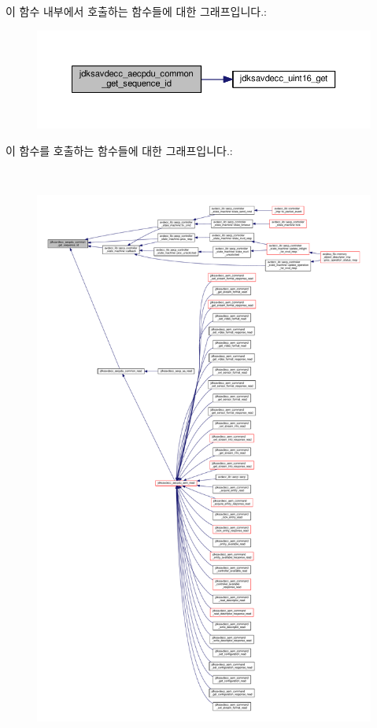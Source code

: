 이 함수 내부에서 호출하는 함수들에 대한 그래프입니다.\+:
\nopagebreak
\begin{figure}[H]
\begin{center}
\leavevmode
\includegraphics[width=350pt]{group__aecpdu__common_ga4c5015b65543e4753c336d98b63fea28_cgraph}
\end{center}
\end{figure}




이 함수를 호출하는 함수들에 대한 그래프입니다.\+:
\nopagebreak
\begin{figure}[H]
\begin{center}
\leavevmode
\includegraphics[height=550pt]{group__aecpdu__common_ga4c5015b65543e4753c336d98b63fea28_icgraph}
\end{center}
\end{figure}


